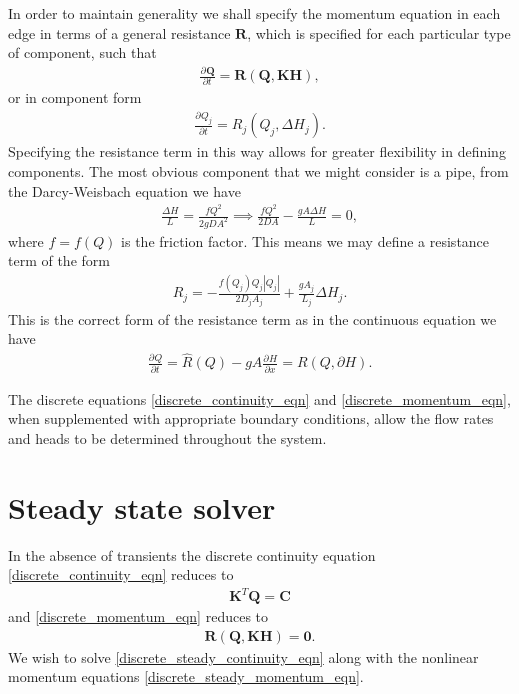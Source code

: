 \documentclass[12pt]{article}
\newcommand{\pardiv}[3]{\frac{\partial^{#1} #2}{\partial #3^{#1}}}
\begin{document}
{\color{green}
In order to maintain generality we shall specify the momentum equation in each edge in terms of a general resistance $\mathbf{R}$, which is specified for each particular type of component, such that 
\begin{align}\label{discrete_momentum_eqn}
\boxed{\pardiv{}{\mathbf{Q}}{t}  = \mathbf{R}(\mathbf{Q}, \mathbf{K} \mathbf{H}),}
\end{align}
or in component form
\begin{align}
\pardiv{}{Q_j}{t} = R_j( Q_j, \Delta H_j ).
\end{align}
Specifying the resistance term in this way allows for greater flexibility in defining components. The most obvious component that we might consider is a pipe, from the Darcy-Weisbach equation we have
\begin{align}
\frac{\Delta H}{L} = \frac{f Q^2}{2 g D A^2} \implies \frac{f Q^2}{2 D A} - \frac{g A \Delta H}{L} = 0,
\end{align}
where $f = f(Q)$ is the friction factor. This means we may define a resistance term of the form
\begin{align}\label{pipe_resistance}
\boxed{ R_j = - \frac{f(Q_j)Q_j|Q_j|}{2 D_j A_j} + \frac{g A_j}{L_j} \Delta H_j. }
\end{align}
This is the correct form of the resistance term as in the continuous equation we have
\begin{align*}
\pardiv{}{Q}{t} = \hat{R}(Q) - g A \pardiv{}{H}{x} = R( Q, \partial H).
\end{align*}
}

The discrete equations \eqref{discrete_continuity_eqn} and \eqref{discrete_momentum_eqn}, when supplemented with appropriate boundary conditions, allow the flow rates and heads to be determined throughout the system. 

\section{Steady state solver} \label{sec:steady_state} 

In the absence of transients the discrete continuity equation \eqref{discrete_continuity_eqn} reduces to 
\begin{align}\label{discrete_steady_continuity_eqn}
\boxed{\mathbf{K}^T \mathbf{Q} = \mathbf{C}}
\end{align} 
and \eqref{discrete_momentum_eqn} reduces to 
{\color{green}
\begin{align}\label{discrete_steady_momentum_eqn}
\boxed{\mathbf{R}(\mathbf{Q}, \mathbf{K} \mathbf{H}) = \mathbf{0} .}
\end{align}}
We wish to solve \eqref{discrete_steady_continuity_eqn} along with the nonlinear momentum equations \eqref{discrete_steady_momentum_eqn}.
\end{document}
